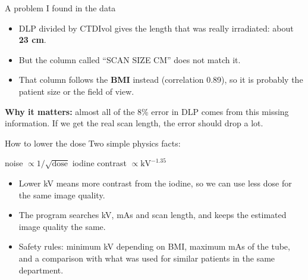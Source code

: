 \documentclass[aspectratio=169,11pt]{beamer}
\begin{document}
\begin{frame}{A problem I found in the data}
\vspace{2mm}
\begin{itemize}\itemsep8pt
  \item DLP divided by CTDIvol gives the length that was really irradiated: about \textbf{23 cm}.
  \item But the column called ``SCAN SIZE CM'' does not match it.
  \item That column follows the \textbf{BMI} instead (correlation 0.89), so it is probably the patient size or the
  field of view.
\end{itemize}
\vspace{6mm}
\textbf{Why it matters:} almost all of the 8\% error in DLP comes from this missing information.
If we get the real scan length, the error should drop a lot.
\end{frame}

\begin{frame}{How to lower the dose}
\vspace{1mm}
Two simple physics facts:
\begin{center}
noise $\propto 1/\sqrt{\mathrm{dose}}$ \qquad\qquad iodine contrast $\propto \mathrm{kV}^{-1.35}$
\end{center}
\vspace{3mm}
\begin{itemize}\itemsep6pt
  \item Lower kV means more contrast from the iodine, so we can use less dose for the same image quality.
  \item The program searches kV, mAs and scan length, and keeps the estimated image quality the same.
  \item Safety rules: minimum kV depending on BMI, maximum mAs of the tube, and a comparison with what was used
  for similar patients in the same department.
\end{itemize}
\end{frame}
\end{document}
